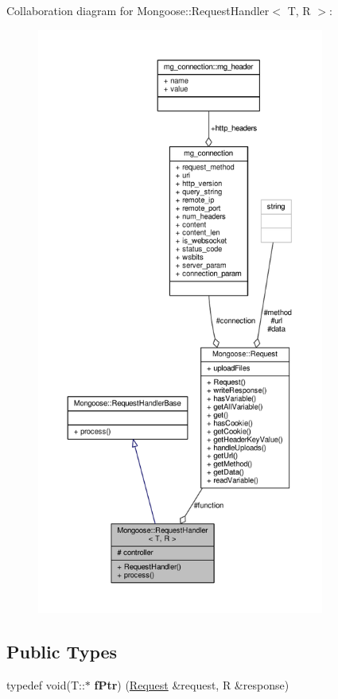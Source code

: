 Collaboration diagram for Mongoose\+:\+:Request\+Handler$<$ T, R $>$\+:
\nopagebreak
\begin{figure}[H]
\begin{center}
\leavevmode
\includegraphics[height=550pt]{db/dcf/classMongoose_1_1RequestHandler__coll__graph}
\end{center}
\end{figure}
\subsection*{Public Types}
\begin{DoxyCompactItemize}
\item 
typedef void(T\+::$\ast$ {\bfseries f\+Ptr}) (\hyperlink{classMongoose_1_1Request}{Request} \&request, R \&response)\hypertarget{classMongoose_1_1RequestHandler_af8fe37334b4d8ef321acfd75952ffc44}{}\label{classMongoose_1_1RequestHandler_af8fe37334b4d8ef321acfd75952ffc44}

\end{DoxyCompactItemize}
